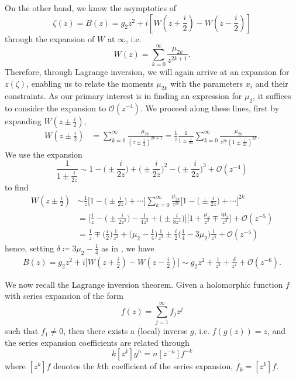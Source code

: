 \documentclass[10pt]{article}
\newcommand{\mcal}[1]{\mathcal{#1}}
\theoremstyle{plain}
\theoremstyle{definition}
\theoremstyle{plain}
\begin{document}
On the other hand, we know the asymptotics of 
\[\zeta(z)=B(z) = g_2z^2 + i [W(z+\frac{i}{2})-W(z-\frac{i}{2})]\] 
through the expansion of $W$ at $\infty$, i.e. 
\[  W(z) = \sum_{k=0}^\infty \frac{\mu_{2k}}{z^{2k+1}}.  \]
Therefore, through Lagrange inversion, we will again arrive at an expansion for $z(\zeta)$, enabling us to relate the moments $\mu_{2k}$ with the parameters $x_i$ and their constraints. As our primary interest is in finding an expression for $\mu_2$, it suffices to consider the expansion to $\mcal{O}(z^{-4})$. We proceed along these lines, first by expanding $W(z\pm \frac{i}{2})$,
\begin{align*}
	W(z\pm \frac{i}{2}) &= \sum_{k=0}^\infty \frac{\mu_{2k}}{(z\pm \frac{i}{2})^{2k+1}} = \frac{1}{z}\frac{1}{1\pm \frac{i}{2z}}\sum_{k=0}^\infty \frac{\mu_{2k}}{z^{2k}(1\pm \frac{i}{2z})^{2k}}.
\end{align*}
We use the expansion
\[ \frac{1}{1\pm \frac{i}{2z}} \sim  1 - \bigg( \pm \frac{i}{2z} \bigg)  + \bigg( \pm\frac{i}{2z}  \bigg)^2 - \bigg( \pm\frac{i}{2z} \bigg)^3 + \mcal{O}(z^{-4}) \]
to find
\begin{align}
	W(z\pm \frac{i}{2}) &\sim \frac{1}{z}\bigg[1 -  \bigg(\pm \frac{i}{2z}\bigg) + \cdots \bigg]\sum_{k=0}^\infty \frac{\mu_{2k}}{z^{2k}}\bigg[ 1 - \bigg( \pm\frac{i}{2z} \bigg) + \cdots \bigg]^{2k} \nonumber\\
	&= \bigg[\frac{1}{z}- \bigg(\pm \frac{i}{2z^2}\bigg) - \frac{1}{4z^3} + \bigg( \pm\frac{i}{8z^4}\bigg) \bigg]\bigg[ 1 + \frac{\mu_2}{z^2} \mp \frac{i\mu_2}{z^3} \bigg]+ \mcal{O}(z^{-5})\nonumber\\
	&= \frac{1}{z} \mp \bigg( \frac{i}{2}\bigg)\frac{1}{z^2} + \bigg(\mu_2- \frac{1}{4}\bigg)\frac{1}{z^3} \pm\frac{i}{2} \bigg( \frac{1}{4} - 3\mu_2  \bigg)\frac{1}{z^4} +\mcal{O}(z^{-5})\label{Wexpansion}
\end{align}
hence, setting $\delta \coloneqq 3\mu_2 - \frac{1}{4}$ as in \cite{kazakov1999d}, we have
\begin{align*}
	B(z)=g_2z^2 + i\bigg[W(z+\frac{i}{2})-W(z-\frac{i}{2})\bigg] \sim g_2z^2 + \frac{1}{z^2} + \frac{\delta}{z^4} + \mcal{O}(z^{-6}).
\end{align*}

We now recall the Lagrange inversion theorem. Given a holomorphic function $f$ with series expansion of the form
\[ f(z) = \sum_{j=1}^\infty f_j z^j \]
such that $f_1\neq 0$, then there exists a (local) inverse $g$, i.e. $f(g(z))=z$, and the series expansion coefficients are related through
\[ k[z^k]g^n = n[z^{-n}]f^{-k} \]
where $[z^k]f$ denotes the $k$th coefficient of the series expansion, $f_k = [z^k]f$. \\
\end{document}
